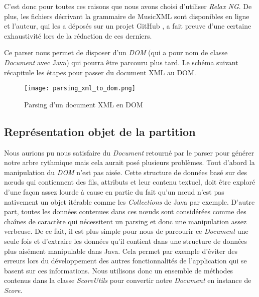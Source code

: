 \par
C'est donc pour toutes ces raisons que nous avons choisi d'utiliser \emph{Relax NG}. De plus, les fichiers décrivant la grammaire de MusicXML sont disponibles en ligne et l'auteur, qui les a déposés sur un projet GitHub \cite{relaxng_for_musicxml}, a fait preuve d'une certaine exhaustivité lors de la rédaction de ces derniers.

\par
Ce parser nous permet de disposer d'un \emph{DOM} (qui a pour nom de classe \emph{Document} avec Java) qui pourra être parcouru plus tard. Le schéma suivant récapitule les étapes pour passer du document XML au DOM.


\begin{figure}[!h]
\centering
\texttt{[image: parsing\_xml\_to\_dom.png]}\\[1cm]
\caption{Parsing d'un document XML en DOM}
\end{figure}


\subsection{Représentation objet de la partition}

\par
Nous aurions pu nous satisfaire du \emph{Document} retourné par le parser pour générer notre arbre rythmique mais cela aurait posé plusieurs problèmes. Tout d'abord la manipulation du \emph{DOM} n'est pas aisée. Cette structure de données basé sur des nœuds qui contiennent des fils, attributs et leur contenu textuel, doit être exploré d'une façon assez lourde à cause en partie du fait qu'un nœud n'est pas nativement un objet itérable comme les \emph{Collections} de Java par exemple. D'autre part, toutes les données contenues dans ces nœuds sont considérées comme des chaînes de caractère qui nécessitent un parsing et donc une manipulation assez verbeuse. De ce fait, il est plus simple pour nous de parcourir ce \emph{Document} une seule fois et d'extraire les données qu'il contient dans une structure de données plus aisément manipulable dans Java. Cela permet par exemple d'éviter des erreurs lors du développement des autres fonctionnalités de l'application qui se basent sur ces informations. Nous utilisons donc un ensemble de méthodes contenus dans la classe \emph{ScoreUtils} pour convertir notre \emph{Document} en instance de \emph{Score}.

